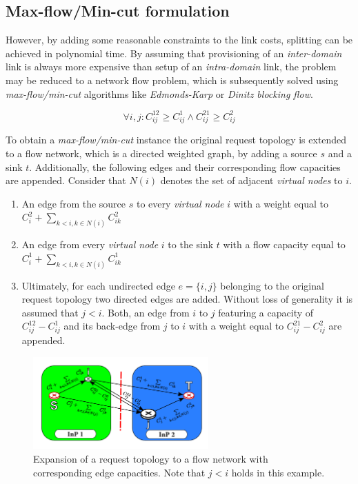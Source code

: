 \documentclass[prodmode,acmtomccap]{acmlarge}
\begin{document}
\subsection{Max-flow/Min-cut formulation}
However, by adding some reasonable constraints to the link costs, splitting can be achieved in polynomial time. By assuming that provisioning of an \emph{inter-domain} link is always more expensive
than setup of an \emph{intra-domain} link, the problem may be reduced to a network flow problem, which is subsequently solved using \emph{max-flow/min-cut} algorithms like \emph{Edmonds-Karp}
or \emph{Dinitz blocking flow}.

\normalsize

$$
	\forall i,j: C_{ij}^{12} \geq C_{ij}^1 \wedge C_{ij}^{21} \geq C_{ij}^2
$$

\small

To obtain a \emph{max-flow/min-cut} instance the original request topology is extended to a flow network, which is a directed weighted graph, by adding a source $s$ and a sink $t$.
Additionally, the following edges and their corresponding flow capacities are appended. Consider that $N(i)$ denotes the set of adjacent \emph{virtual nodes} to $i$.

\begin{enumerate}
	\item An edge from the source $s$ to every \emph{virtual node} $i$ with a weight equal to $C_i^2 + \sum\limits_{k < i, k \in N(i)} C_{ik}^2$
	\item An edge from every \emph{virtual node} $i$ to the sink $t$ with a flow capacity equal to $C_i^1 + \sum\limits_{k < i, k \in N(i)} C_{ik}^1$
	\item Ultimately, for each undirected edge $e=\{i,j\}$ belonging to the original request topology two directed edges are added. Without loss of generality it is assumed that $j < i$.
		Both, an edge from $i$ to $j$ featuring a capacity of $C_{ij}^{12} - C_{ij}^1$ and its back-edge from $j$ to $i$ with a weight equal to $C_{ij}^{21} - C_{ij}^2$ are appended.
\end{enumerate}

\begin{figure}[htb]
	\centering
	\includegraphics[width=0.6\textwidth]{maxflow}
	\caption{Expansion of a request topology to a flow network with corresponding edge capacities. Note that $j < i$ holds in this example.}
	\label{fig5}
\end{figure}
\end{document}
